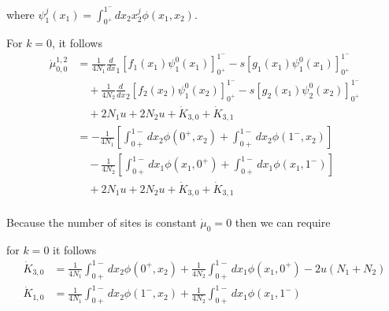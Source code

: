 \documentclass[a4paper, 12pt]{article}
\newcommand{\dev}[1]{\ensuremath{\frac{d}{d #1}}}
\begin{document}
where $\psi_1^j(x_1) = \int_{0^+}^{1^-}dx_2 x_2^j \phi(x_1,x_2)$.

For $k = 0$, it follows 
\begin{align}
  \dot \mu_{0,0}^{1,2} &= 
  \frac{1}{4N_1} \dev x_1 [f_1(x_1)\psi_1^0(x_1)]_{0^+}^{1^-}
  - s [g_1(x_1)\psi_1^0(x_1)]_{0^+}^{1^-}
  \nonumber \\
  &\quad + \frac{1}{4N_2} \dev x_2 [f_2(x_2)\psi_1^0(x_2)]_{0^+}^{1^-}
  - s [g_2(x_1)\psi_2^0(x_2)]_{0^+}^{1^-}
  \nonumber \\
  &\quad +2N_1u + 2N_2u + \dot K_{3,0}  + \dot K_{3,1}
  \nonumber \\
 &= - \frac{1}{4N_1}[\int_{0+}^{1-} dx_2\phi(0^+, x_2) + \int_{0+}^{1-}
   dx_2\phi(1^-,x_2)]
   \nonumber \\
  &\quad - \frac{1}{4N_2}[\int_{0+}^{1-} dx_1\phi(x_1, 0^+) + \int_{0+}^{1-}
   dx_1\phi(x_1, 1^-)]
  \nonumber \\
  &\quad +2N_1u + 2N_2u + \dot K_{3,0}  + \dot K_{3,1}
  \nonumber \\
\end{align}

Because the number of sites is constant $\dot \mu_0 = 0$ then we can require

for $k = 0$ it follows 
\begin{align}
  \dot K_{3,0} &= 
  \frac{1}{4N_1}\int_{0+}^{1-} dx_2\phi(0^+, x_2) + 
  \frac{1}{4N_2}\int_{0+}^{1-} dx_1\phi(x_1, 0^+) - 
  2u(N_1 + N_2) \\
  \dot K_{1,0} &= 
  \frac{1}{4N_1}\int_{0+}^{1-} dx_2\phi(1^-, x_2) + 
  \frac{1}{4N_2}\int_{0+}^{1-} dx_1\phi(x_1, 1^-) 
\end{align}
\end{document}
